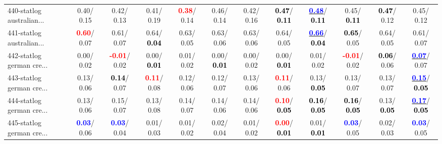 \begin{table}[h]
\begin{center}
{\begin{tabular}{lc|c|c|c|c|c|c|c|c|c|c}
440-statlog australian... &   0.40/  0.15 &   0.42/  0.13 &   0.41/  0.19 & \textcolor{red}{\textbf{  0.38}}/  0.14 &   0.46/  0.14 &   0.42/  0.16 & \textcolor{black}{\textbf{  0.47}}/\textcolor{black}{\textbf{  0.11}} & \underline{\textcolor{blue}{\textbf{  0.48}}}/\textcolor{black}{\textbf{  0.11}} &   0.45/\textcolor{black}{\textbf{  0.11}} & \textcolor{black}{\textbf{  0.47}}/  0.12 &   0.45/  0.12 \\
441-statlog australian... & \textcolor{red}{\textbf{  0.60}}/  0.07 &   0.61/  0.07 &   0.64/\textcolor{black}{\textbf{  0.04}} &   0.63/  0.05 &   0.63/  0.06 &   0.63/  0.06 &   0.64/  0.05 & \underline{\textcolor{blue}{\textbf{  0.66}}}/\textcolor{black}{\textbf{  0.04}} & \textcolor{black}{\textbf{  0.65}}/  0.05 &   0.64/  0.05 &   0.61/  0.07 \\
442-statlog german cre... &   0.00/  0.02 & \textcolor{red}{\textbf{ -0.01}}/  0.02 &   0.00/\textcolor{black}{\textbf{  0.01}} &   0.01/  0.02 &   0.00/\textcolor{black}{\textbf{  0.01}} &   0.00/  0.02 &   0.00/\textcolor{black}{\textbf{  0.01}} &   0.01/  0.02 & \textcolor{red}{\textbf{ -0.01}}/  0.02 & \textcolor{black}{\textbf{  0.06}}/  0.06 & \underline{\textcolor{blue}{\textbf{  0.07}}}/  0.07 \\
443-statlog german cre... &   0.13/  0.06 & \textcolor{black}{\textbf{  0.14}}/  0.07 & \textcolor{red}{\textbf{  0.11}}/  0.08 &   0.12/  0.06 &   0.12/  0.07 &   0.13/  0.06 & \textcolor{red}{\textbf{  0.11}}/  0.06 &   0.13/\textcolor{black}{\textbf{  0.05}} &   0.13/  0.07 &   0.13/  0.07 & \underline{\textcolor{blue}{\textbf{  0.15}}}/\textcolor{black}{\textbf{  0.05}} \\
444-statlog german cre... &   0.13/  0.06 &   0.15/  0.07 &   0.13/  0.08 &   0.14/  0.07 &   0.14/  0.06 &   0.14/  0.06 & \textcolor{red}{\textbf{  0.10}}/\textcolor{black}{\textbf{  0.05}} & \textcolor{black}{\textbf{  0.16}}/\textcolor{black}{\textbf{  0.05}} & \textcolor{black}{\textbf{  0.16}}/\textcolor{black}{\textbf{  0.05}} &   0.13/\textcolor{black}{\textbf{  0.05}} & \underline{\textcolor{blue}{\textbf{  0.17}}}/\textcolor{black}{\textbf{  0.05}} \\ \hline
445-statlog german cre... & \textcolor{blue}{\textbf{  0.03}}/  0.06 & \textcolor{blue}{\textbf{  0.03}}/  0.04 &   0.01/  0.03 &   0.01/  0.02 &   0.02/  0.04 &   0.01/  0.02 & \textcolor{red}{\textbf{  0.00}}/\textcolor{black}{\textbf{  0.01}} &   0.01/\textcolor{black}{\textbf{  0.01}} & \textcolor{blue}{\textbf{  0.03}}/  0.05 &   0.02/  0.03 & \textcolor{blue}{\textbf{  0.03}}/  0.05 \\

\end{tabular}}
\end{center}
\end{table}

